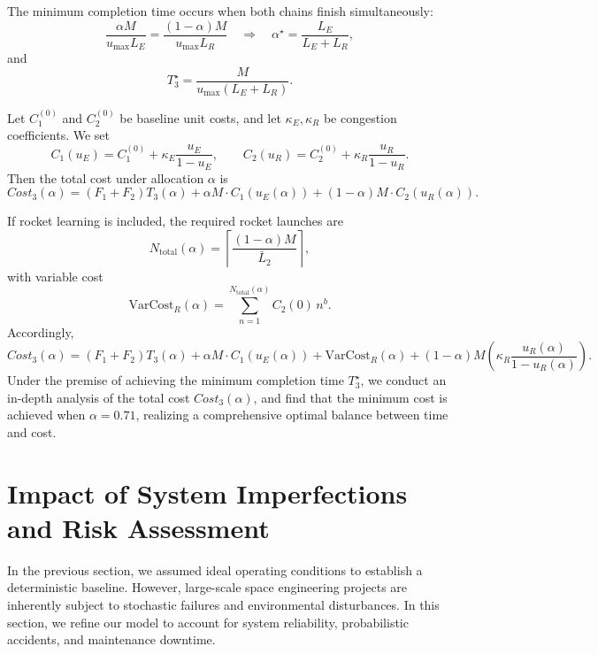 \documentclass{mcmthesis}
\begin{document}
The minimum completion time occurs when both chains finish simultaneously:
\begin{equation}
\frac{\alpha M}{u_{\max}L_E}=\frac{(1-\alpha)M}{u_{\max}L_R}
\quad\Rightarrow\quad
\alpha^\star=\frac{L_E}{L_E+L_R},
\end{equation}
and
\begin{equation}
T_3^\star=\frac{M}{u_{\max}(L_E+L_R)}.
\end{equation}

Let $C_1^{(0)}$ and $C_2^{(0)}$ be baseline unit costs, and let $\kappa_E,\kappa_R$ be congestion coefficients.
We set
\begin{equation}
C_1(u_E)=C_1^{(0)}+\kappa_E\frac{u_E}{1-u_E},\qquad
C_2(u_R)=C_2^{(0)}+\kappa_R\frac{u_R}{1-u_R}.
\end{equation}
Then the total cost under allocation $\alpha$ is
\begin{equation}
Cost_3(\alpha)=(F_1+F_2)T_3(\alpha)+\alpha M\cdot C_1(u_E(\alpha))+(1-\alpha)M\cdot C_2(u_R(\alpha)).
\end{equation}

If rocket learning is included, the required rocket launches are
\begin{equation}
N_{\text{total}}(\alpha)=\left\lceil\frac{(1-\alpha)M}{\bar L_2}\right\rceil,
\end{equation}
with variable cost
\begin{equation}
\text{VarCost}_R(\alpha)=\sum_{n=1}^{N_{\text{total}}(\alpha)}C_2(0)\,n^{b}.
\end{equation}
Accordingly,
\begin{equation}
Cost_3(\alpha)=(F_1+F_2)T_3(\alpha)+\alpha M\cdot C_1(u_E(\alpha))
+\text{VarCost}_R(\alpha)
+(1-\alpha)M\left(\kappa_R\frac{u_R(\alpha)}{1-u_R(\alpha)}\right).
\end{equation}
Under the premise of achieving the minimum completion time $T_3^\star$, we conduct an in-depth analysis of the total cost $Cost_3(\alpha)$, and find that the minimum cost is achieved when $\alpha = 0.71$, realizing a comprehensive optimal balance between time and cost.



\section{Impact of System Imperfections and Risk Assessment}
In the previous section, we assumed ideal operating conditions to establish a deterministic baseline. However, large-scale space engineering projects are inherently subject to stochastic failures and environmental disturbances. In this section, we refine our model to account for system reliability, probabilistic accidents, and maintenance downtime.
\end{document}
